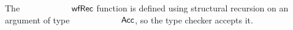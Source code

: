 \begin{code}%
%
\>[2]\AgdaSpace{}%
\AgdaSymbol{:}\AgdaSpace{}%
\AgdaSymbol{(}\AgdaSpace{}%
\AgdaSymbol{:}\AgdaSpace{}%
\AgdaSpace{}%
\AgdaSpace{}%
\AgdaSpace{}%
\AgdaSymbol{)}\<%
\\
\>[2][@{}l@{\AgdaIndent{0}}]%
\>[4]\AgdaSpace{}%
\AgdaSpace{}%
\AgdaSpace{}%
\AgdaSpace{}%
\AgdaSpace{}%
\AgdaSpace{}%
\AgdaSpace{}%
\AgdaSpace{}%
\AgdaOperator{\AgdaBound{<}}\AgdaSpace{}%
\AgdaSpace{}%
\AgdaSpace{}%
\AgdaSpace{}%
\AgdaSymbol{)}\AgdaSpace{}%
\AgdaSpace{}%
\AgdaSpace{}%
\AgdaSymbol{)}\<%
\\
%
\>[4]\AgdaSpace{}%
\AgdaSpace{}%
\AgdaSpace{}%
\AgdaSpace{}%
\AgdaSpace{}%
\<%
\end{code}
The $\AgdaFunction{wfRec}$ function is defined using structural recursion on an argument
of type $\AgdaDatatype{Acc}$, so the type checker accepts it.
